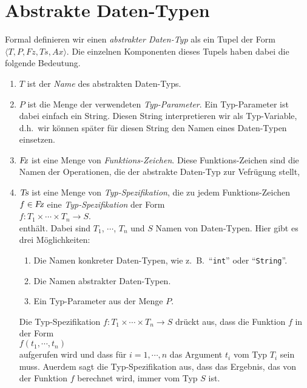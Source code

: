 \section{Abstrakte Daten-Typen}
Formal definieren wir einen \emph{abstrakter Daten-Typ} als ein Tupel der Form
 $\langle T, P, Fz, Ts, Ax \rangle$.
Die einzelnen Komponenten dieses Tupels haben dabei die folgende Bedeutung.
\begin{enumerate}
\item $T$ ist der \emph{Name} des abstrakten Daten-Typs.
\item $P$ ist die Menge der verwendeten \emph{Typ-Parameter}.  Ein Typ-Parameter ist dabei
      einfach ein String.  Diesen String interpretieren wir als Typ-Variable,
      d.h.~wir k\"onnen sp\"ater f\"ur diesen String den Namen eines Daten-Typen einsetzen.
\item $\textsl{Fz}$ ist eine Menge von \emph{Funktions-Zeichen}.  Diese Funktions-Zeichen
      sind die Namen der Operationen, die der abstrakte Daten-Typ zur Vefr\"ugung stellt,
\item $\textsl{Ts}$ ist eine Menge von \emph{Typ-Spezifikation}, die zu jedem Funktions-Zeichen
      $f \in \textsl{Fz}$
      eine \emph{Typ-Spezifikation} der Form \\[0.1cm]
      \hspace*{1.3cm} 
      $f: T_1 \times \cdots \times T_n \rightarrow S$. \\[0.1cm]
      enth\"alt. Dabei sind $T_1$, $\cdots$, $T_n$ und $S$ Namen von 
      Daten-Typen.  Hier gibt es drei M\"oglichkeiten: 
      \begin{enumerate}
      \item Die Namen konkreter Daten-Typen, wie z.~B.~``\texttt{int}'' 
            oder ``\texttt{String}''.
      \item Die Namen abstrakter Daten-Typen.
      \item Ein Typ-Parameter aus der Menge $P$.
      \end{enumerate}
      Die Typ-Spezifikation $f: T_1 \times \cdots \times T_n \rightarrow S$ dr\"uckt aus, dass die
      Funktion $f$ in der Form \\[0.1cm] 
      \hspace*{1.3cm} $f(t_1,\cdots,t_n)$ \\[0.1cm]
      aufgerufen wird und dass f\"ur $i=1,\cdots,n$ das Argument $t_i$ vom Typ
      $T_i$ sein muss.  Au\3erdem sagt die Typ-Spezifikation aus, dass das
      Ergebnis, das von der Funktion $f$ berechnet wird, immer vom Typ $S$ ist.


\end{enumerate}
